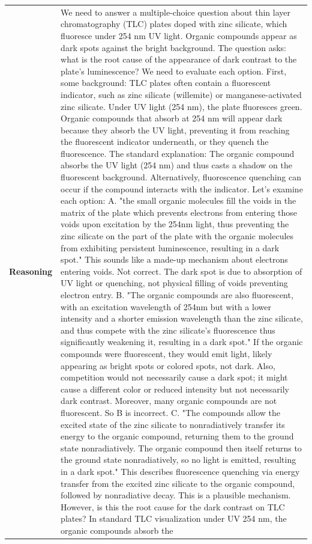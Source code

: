 \begin{longtable}{@{}l p{13cm}@{}}
  \textbf{Reasoning} & We need to answer a multiple-choice question about thin layer chromatography (TLC) plates doped with zinc silicate, which fluoresce under 254 nm UV light. Organic compounds appear as dark spots against the bright background. The question asks: what is the root cause of the appearance of dark contrast to the plate's luminescence? \newline We need to evaluate each option. \newline First, some background: TLC plates often contain a fluorescent indicator, such as zinc silicate (willemite) or manganese-activated zinc silicate. Under UV light (254 nm), the plate fluoresces green. Organic compounds that absorb at 254 nm will appear dark because they absorb the UV light, preventing it from reaching the fluorescent indicator underneath, or they quench the fluorescence. The standard explanation: The organic compound absorbs the UV light (254 nm) and thus casts a shadow on the fluorescent background. Alternatively, fluorescence quenching can occur if the compound interacts with the indicator. \newline Let's examine each option: \newline A. "the small organic molecules fill the voids in the matrix of the plate which prevents electrons from entering those voids upon excitation by the 254nm light, thus preventing the zinc silicate on the part of the plate with the organic molecules from exhibiting persistent luminescence, resulting in a dark spot." \newline This sounds like a made-up mechanism about electrons entering voids. Not correct. The dark spot is due to absorption of UV light or quenching, not physical filling of voids preventing electron entry. \newline B. "The organic compounds are also fluorescent, with an excitation wavelength of 254nm but with a lower intensity and a shorter emission wavelength than the zinc silicate, and thus compete with the zinc silicate's fluorescence thus significantly weakening it, resulting in a dark spot." \newline If the organic compounds were fluorescent, they would emit light, likely appearing as bright spots or colored spots, not dark. Also, competition would not necessarily cause a dark spot; it might cause a different color or reduced intensity but not necessarily dark contrast. Moreover, many organic compounds are not fluorescent. So B is incorrect. \newline C. "The compounds allow the excited state of the zinc silicate to nonradiatively transfer its energy to the organic compound, returning them to the ground state nonradiatively. The organic compound then itself returns to the ground state nonradiatively, so no light is emitted, resulting in a dark spot." \newline This describes fluorescence quenching via energy transfer from the excited zinc silicate to the organic compound, followed by nonradiative decay. This is a plausible mechanism. However, is this the root cause for the dark contrast on TLC plates? In standard TLC visualization under UV 254 nm, the organic compounds absorb the 
\end{longtable}

